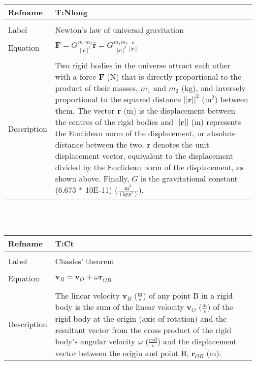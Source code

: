 \documentclass[12pt]{article}
\begin{document}
\noindent \begin{minipage}{\textwidth}
\begin{tabular}{p{} p{}}
\toprule \textbf{Refname} & \textbf{T:Nloug}
\label{T:Nloug}
\\ \midrule \\
Label & Newton's law of universal gravitation
\\ \midrule \\
Equation & $\mathbf{F}=G\frac{m_{1}m_{2}}{||\mathbf{r}||^{2}}\mathbf{\hat{r}}=G\frac{m_{1}m_{2}}{||\mathbf{r}||^{2}}\frac{\mathbf{r}}{||\mathbf{r}||}$
\\ \midrule \\
Description & Two rigid bodies in the universe attract each other with a force $\mathbf{F}$ (N) that is directly proportional to the product of their masses, $m_{1}$ and $m_{2}$ (kg), and inversely proportional to the squared distance $||\mathbf{r}||^{2}$ ($\text{m}^{2}$) between them. The vector $\mathbf{r}$ (m) is the displacement between the centres of the rigid bodies and $||\mathbf{r}||$ (m) represents the Euclidean norm of the displacement, or absolute distance between the two. $\mathbf{\hat{r}}$ denotes the unit displacement vector, equivalent to the displacement divided by the Euclidean norm of the displacement, as shown above. Finally, $G$ is the gravitational constant (6.673 * 10E-11) ($\frac{\text{m}^{3}}{(\text{kg}\text{s}^{2})}$).
\\ \bottomrule \end{tabular}
\end{minipage}\\
~\newline
\noindent \begin{minipage}{\textwidth}
\begin{tabular}{p{} p{}}
\toprule \textbf{Refname} & \textbf{T:Ct}
\label{T:Ct}
\\ \midrule \\
Label & Chasles' theorem
\\ \midrule \\
Equation & $\mathbf{v}_{B}=\mathbf{v}_{O}+\omega{}\mathbf{r}_{OB}$
\\ \midrule \\
Description & The linear velocity $\mathbf{v}_{B}$ ($\frac{\text{m}}{\text{s}}$) of any point B in a rigid body is the sum of the linear velocity $\mathbf{v}_{O}$ ($\frac{\text{m}}{\text{s}}$) of the rigid body at the origin (axis of rotation) and the resultant vector from the cross product of the rigid body's angular velocity $\omega{}$ ($\frac{\text{rad}}{\text{s}}$) and the displacement vector between the origin and point B, $\mathbf{r}_{OB}$ (m).
\\ \bottomrule \end{tabular}
\end{minipage}\\
\end{document}
